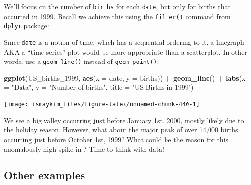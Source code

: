 \documentclass[12pt, krantz2,]{krantz}
\makeatletter
\newenvironment{Shaded}{\begin{snugshade}}{\end{snugshade}}
\newcommand{\DataTypeTok}[1]{\textcolor[rgb]{0.27,0.27,0.27}{#1}}
\newcommand{\DecValTok}[1]{\textcolor[rgb]{0.06,0.06,0.06}{#1}}
\newcommand{\KeywordTok}[1]{\textcolor[rgb]{0.27,0.27,0.27}{\textbf{#1}}}
\newcommand{\NormalTok}[1]{#1}
\newcommand{\OperatorTok}[1]{\textcolor[rgb]{0.43,0.43,0.43}{\textbf{#1}}}
\newcommand{\StringTok}[1]{\textcolor[rgb]{0.5,0.5,0.5}{#1}}
\newenvironment{kframe}{%
\medskip{}
\setlength{\fboxsep}{.8em}
 \def\at@end@of@kframe{}%
 \ifinner\ifhmode%
  \def\at@end@of@kframe{\end{minipage}}%
  \begin{minipage}{\columnwidth}%
 \fi\fi%
 \def\FrameCommand##1{\hskip\@totalleftmargin \hskip-\fboxsep
 \colorbox{shadecolor}{##1}\hskip-\fboxsep
     \hskip-\linewidth \hskip-\@totalleftmargin \hskip\columnwidth}%
 \MakeFramed {\advance\hsize-\width
   \@totalleftmargin\z@ \linewidth\hsize
   \@setminipage}}%
 {\par\unskip\endMakeFramed%
 \at@end@of@kframe}
\renewenvironment{Shaded}{\begin{kframe}}{\end{kframe}}
\makeatother
\begin{document}
We'll focus on the number of \texttt{births} for each \texttt{date}, but only for births that occurred in 1999. Recall we achieve this using the \texttt{filter()} command from \texttt{dplyr} package:

\begin{Shaded}
\end{Shaded}

Since \texttt{date} is a notion of time, which has a sequential ordering to it, a linegraph AKA a ``time series'' plot would be more appropriate than a scatterplot. In other words, use a \texttt{geom\_line()} instead of \texttt{geom\_point()}:

\begin{Shaded}
\begin{Highlighting}[]
\KeywordTok{ggplot}\NormalTok{(US_births_}\DecValTok{1999}\NormalTok{, }\KeywordTok{aes}\NormalTok{(}\DataTypeTok{x =}\NormalTok{ date, }\DataTypeTok{y =}\NormalTok{ births)) }\OperatorTok{+}
\StringTok{  }\KeywordTok{geom_line}\NormalTok{() }\OperatorTok{+}
\StringTok{  }\KeywordTok{labs}\NormalTok{(}\DataTypeTok{x =} \StringTok{"Data"}\NormalTok{, }\DataTypeTok{y =} \StringTok{"Number of births"}\NormalTok{, }\DataTypeTok{title =} \StringTok{"US Births in 1999"}\NormalTok{)}
\end{Highlighting}
\end{Shaded}

\begin{center}\texttt{[image: ismaykim\_files/figure-latex/unnamed-chunk-440-1]} \end{center}

We see a big valley occurring just before January 1st, 2000, mostly likely due to the holiday season. However, what about the major peak of over 14,000 births occurring just before October 1st, 1999? What could be the reason for this anomalously high spike in ? Time to think with data!

\hypertarget{other-examples}{%
\subsection{Other examples}\label{other-examples}}
\end{document}
